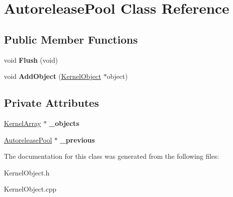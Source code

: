\hypertarget{class_autorelease_pool}{}\section{Autorelease\+Pool Class Reference}
\label{class_autorelease_pool}
\subsection*{Public Member Functions}
\begin{DoxyCompactItemize}
\item 
\mbox{\label{class_autorelease_pool_a0cb469d59376fef7cb5a822606af977f}} 
void {\bfseries Flush} (void)
\item 
\mbox{\label{class_autorelease_pool_a240527d400e2f31879246667eea3bb1b}} 
void {\bfseries Add\+Object} (\hyperlink{class_kernel_object}{Kernel\+Object} $\ast$object)
\end{DoxyCompactItemize}
\subsection*{Private Attributes}
\begin{DoxyCompactItemize}
\item 
\mbox{\label{class_autorelease_pool_a35648f63c1f40ed7de9fe3e3d4d45145}} 
\hyperlink{class_kernel_array}{Kernel\+Array} $\ast$ {\bfseries \+\_\+objects}
\item 
\mbox{\label{class_autorelease_pool_a07dd69f30cbaf1e8fb7c5f3b171c5100}} 
\hyperlink{class_autorelease_pool}{Autorelease\+Pool} $\ast$ {\bfseries \+\_\+previous}
\end{DoxyCompactItemize}


The documentation for this class was generated from the following files\+:\begin{DoxyCompactItemize}
\item 
Kernel\+Object.\+h\item 
Kernel\+Object.\+cpp\end{DoxyCompactItemize}
